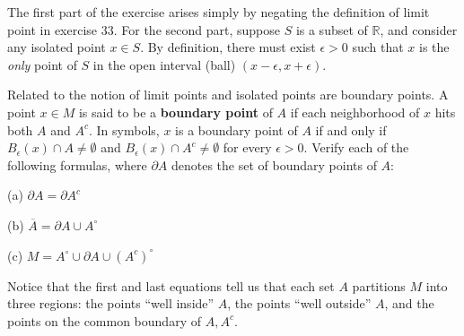 \begin{solution}

    The first part of the exercise arises simply by negating the definition of limit point in exercise 33.
    For the second part, suppose $S$ is a subset of $\mathbb{R}$, and consider any isolated point $x \in S$.
    By definition, there must exist $\epsilon > 0$ such that $x$ is the \textit{only} point of $S$ in the open interval (ball) $(x - \epsilon, x + \epsilon)$.

\end{solution}

\begin{exercise}{41}
    Related to the notion of limit points and isolated points are boundary points.
    A point $x \in M$ is said to be a \textbf{boundary point} of $A$ if each neighborhood of $x$ hits both $A$ and $A^c$.
    In symbols, $x$ is a boundary point of $A$ if and only if $B_{\epsilon}(x) \cap A \neq \emptyset$ and $B_{\epsilon}(x) \cap A^c \neq \emptyset$ for every $\epsilon > 0$.
    Verify each of the following formulas, where $\partial A$ denotes the set of boundary points of $A$:

    (a) $\partial A = \partial A^c$

    (b) $\overline{{A}} = \partial A \cup A^{\circ}$

    (c) $M = A^\circ \cup \partial A \cup ({A^{c}})^{\circ}$

    Notice that the first and last equations tell us that each set $A$ partitions $M$ into three regions: the points ``well inside'' $A$, the points ``well outside'' $A$, and the points on the common boundary of $A, A^{c}$.

\end{exercise}

